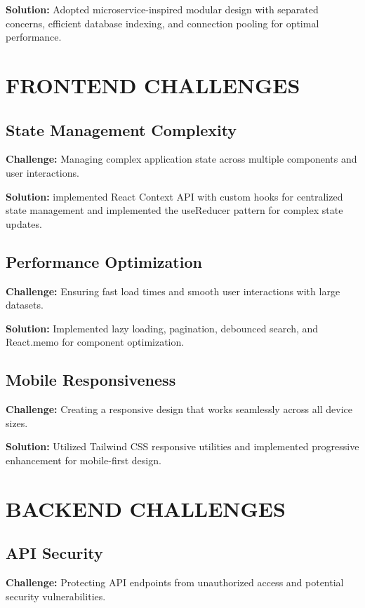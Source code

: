 \textbf{Solution:} Adopted microservice-inspired modular design with separated concerns, efficient database indexing, and connection pooling for optimal performance.

\section{FRONTEND CHALLENGES}

\subsection{State Management Complexity}

\textbf{Challenge:} Managing complex application state across multiple components and user interactions.

\textbf{Solution:} implemented React Context API with custom hooks for centralized state management and implemented the useReducer pattern for complex state updates.

\subsection{Performance Optimization}

\textbf{Challenge:} Ensuring fast load times and smooth user interactions with large datasets.

\textbf{Solution:} Implemented lazy loading, pagination, debounced search, and React.memo for component optimization.

\subsection{Mobile Responsiveness}

\textbf{Challenge:} Creating a responsive design that works seamlessly across all device sizes.

\textbf{Solution:} Utilized Tailwind CSS responsive utilities and implemented progressive enhancement for mobile-first design.

\section{BACKEND CHALLENGES}

\subsection{API Security}

\textbf{Challenge:} Protecting API endpoints from unauthorized access and potential security vulnerabilities.

